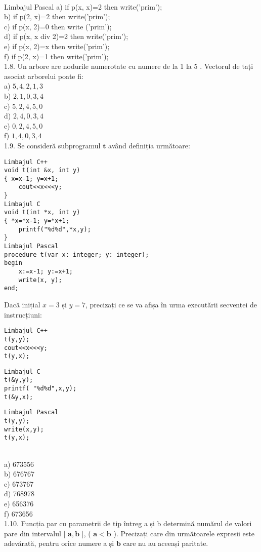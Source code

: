\\
Limbajul Pascal
a) if p(x, x)=2 then write('prim');
\\
b) if p(2, x)=2 then write('prim');
\\
c) if p(x, 2)=0 then write ('prim');
\\
d) if p(x, x div 2)=2 then write('prim');
\\
e) if p(x, 2)=x then write('prim');
\\
f) if p(2, x)=1 then write('prim');
\\
1.8. Un arbore are nodurile numerotate cu numere de la 1 la 5 . Vectorul de tați asociat arborelui poate fi:
\\
a) $5,4,2,1,3$
\\
b) $2,1,0,3,4$
\\
c) $5,2,4,5,0$
\\
d) $2,4,0,3,4$
\\
e) $0,2,4,5,0$
\\
f) $1,4,0,3,4$
\\
1.9. Se consideră subprogramul $\mathbf{t}$ având definiția următoare:
\begin{verbatim}
Limbajul C++
void t(int &x, int y)
{ x=x-1; y=x+1;
    cout<<x<<<y;
}
Limbajul C
void t(int *x, int y)
{ *x=*x-1; y=*x+1;
    printf("%d%d",*x,y);
}
Limbajul Pascal
procedure t(var x: integer; y: integer);
begin
    x:=x-1; y:=x+1;
    write(x, y);
end;
\end{verbatim}
Dacă inițial $x=3$ și $y=7$, precizați ce se va afișa în urma executării secvenței de instrucțiuni:
\begin{verbatim}
Limbajul C++
t(y,y);
cout<<x<<<y;
t(y,x);
\end{verbatim}
\begin{verbatim}
Limbajul C
t(&y,y);
printf( "%d%d",x,y);
t(&y,x);
\end{verbatim}
\begin{verbatim}
Limbajul Pascal
t(y,y);
write(x,y);
t(y,x);
\end{verbatim}
\\
a) 673556
\\
b) 676767
\\
c) 673767
\\
d) 768978
\\
e) 656376
\\
f) 673656
\\
1.10. Funcția par cu parametrii de tip întreg a și b determină numărul de valori pare din intervalul [ $\mathbf{a}, \mathbf{b}$ ], ( $\mathbf{a}<\mathbf{b}$ ). Precizați care din următoarele expresii este adevărată, pentru orice numere a și $\mathbf{b}$ care nu au aceeași paritate.
